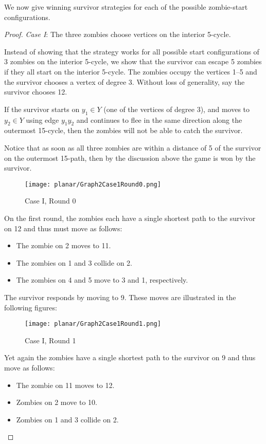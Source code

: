 We now give winning survivor strategies for each of the possible zombie-start configurations.

\begin{proof}
\textit{Case I}: The three zombies choose vertices on the interior 5-cycle.

Instead of showing that the strategy works for all possible start configurations of 3 zombies on the interior 5-cycle,
we show that the survivor can escape 5 zombies if they all start on the interior 5-cycle.
The zombies occupy the vertices 1--5 and the survivor chooses a vertex of degree 3.
Without loss of generality, say the survivor chooses 12.

If the survivor starts on $y_1 \in Y$ (one of the vertices of degree 3), and moves to $y_2\in Y$ using edge $y_1y_2$ and continues to flee in the same direction along the outermost 15-cycle, then the zombies will not be able to catch the survivor.

Notice that as soon as all three zombies are within a distance of 5 of the survivor on the outermost 15-path, then by the discussion above
 the game is won by the survivor.

\begin{figure}[h!]
\centering
\texttt{[image: planar/Graph2Case1Round0.png]}
\caption{Case I, Round 0} \label{fig:planarG3}
\end{figure}

On the first round, the zombies each have a single shortest path to the survivor on 12 and thus must move as follows:

\begin{itemize}
\item The zombie on 2 moves to 11.
\item The zombies on 1 and 3 collide on 2.
\item The zombies on 4 and 5 move to 3 and 1, respectively.
\end{itemize}

The survivor responds by moving to 9. These moves are illustrated in the following figures:
\begin{figure}[h!]
\centering
\texttt{[image: planar/Graph2Case1Round1.png]}
\caption{Case I, Round 1} \label{fig:planarG4}
\end{figure}

\newpage

Yet again the zombies have a single shortest path to the survivor on 9 and thus move as follows:
\begin{itemize}
\item The zombie on 11 moves to 12.
\item Zombies on 2 move to 10.
\item Zombies on 1 and 3 collide on 2.
\end{itemize}


\end{proof}
